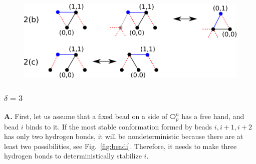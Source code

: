 \begin{figure}
	\centering
	\includegraphics[width=0.8\linewidth]{./Fig/hexagonOut3n}
	
	\caption{}
	\label{fig:hexagonOut2}
\end{figure}


\subsubsection{$\delta = 3$\\}

\textbf{A.} First, let us assume that a fixed bead on a side of $\hexagon_p^n$ has a free hand, and bead $i$ binds to it. If the most stable conformation formed by beads $i, i+1, i+2$ has only two hydrogen bonds, it will be nondeterministic because there are at least two possibilities, see Fig.~\ref{fig:beadi}. Therefore, it needs to make three hydrogen bonds to deterministically stabilize $i$.\\

